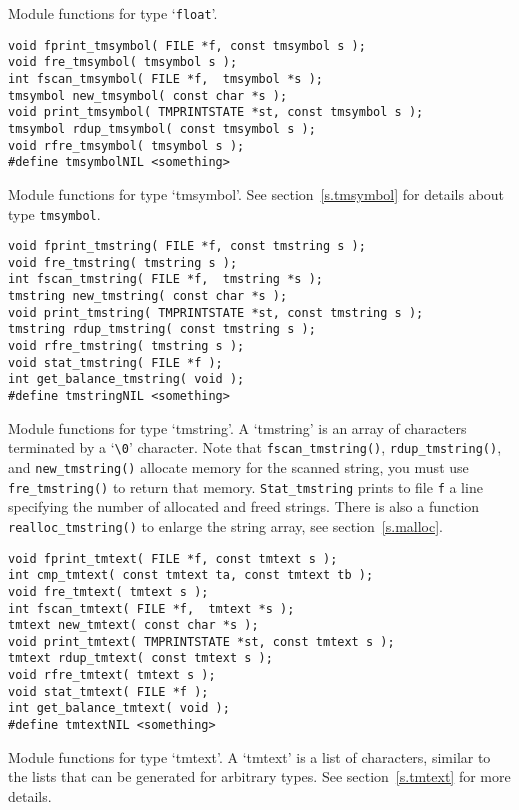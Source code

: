 \begin{desc}
Module functions for type `{\tt float}'.
\end{desc}
\begin{verbatim}
void fprint_tmsymbol( FILE *f, const tmsymbol s );
void fre_tmsymbol( tmsymbol s );
int fscan_tmsymbol( FILE *f,  tmsymbol *s );
tmsymbol new_tmsymbol( const char *s );
void print_tmsymbol( TMPRINTSTATE *st, const tmsymbol s );
tmsymbol rdup_tmsymbol( const tmsymbol s );
void rfre_tmsymbol( tmsymbol s );
#define tmsymbolNIL <something>
\end{verbatim}
\begin{desc}
Module functions for type `tmsymbol'.
See section~\ref{s.tmsymbol} for details about type \verb"tmsymbol".
\end{desc}
\begin{verbatim}
void fprint_tmstring( FILE *f, const tmstring s );
void fre_tmstring( tmstring s );
int fscan_tmstring( FILE *f,  tmstring *s );
tmstring new_tmstring( const char *s );
void print_tmstring( TMPRINTSTATE *st, const tmstring s );
tmstring rdup_tmstring( const tmstring s );
void rfre_tmstring( tmstring s );
void stat_tmstring( FILE *f );
int get_balance_tmstring( void );
#define tmstringNIL <something>
\end{verbatim}
\begin{desc}
Module functions for type `tmstring'.
A `tmstring' is an array of characters terminated by a `\verb+\0+' character.
Note that {\tt fscan\_tmstring()}, {\tt rdup\_tmstring()},
and {\tt new\_tmstring()} allocate memory for the scanned string,
you must use {\tt fre\_tmstring()} to return that memory.
{\tt Stat\_tmstring} prints to file {\tt f} a line specifying the number of
allocated and freed strings.
There is also a function \verb+realloc_tmstring()+ to enlarge the
string array,
see section~\ref{s.malloc}.
\end{desc}
\begin{verbatim}
void fprint_tmtext( FILE *f, const tmtext s );
int cmp_tmtext( const tmtext ta, const tmtext tb );
void fre_tmtext( tmtext s );
int fscan_tmtext( FILE *f,  tmtext *s );
tmtext new_tmtext( const char *s );
void print_tmtext( TMPRINTSTATE *st, const tmtext s );
tmtext rdup_tmtext( const tmtext s );
void rfre_tmtext( tmtext s );
void stat_tmtext( FILE *f );
int get_balance_tmtext( void );
#define tmtextNIL <something>
\end{verbatim}
\begin{desc}
Module functions for type `tmtext'.
A `tmtext' is a list of characters, similar to the lists that can be
generated for arbitrary types. See section~\ref{s.tmtext} for more details.
\end{desc}
